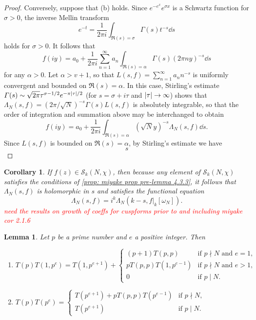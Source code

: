 \documentclass[10pt,leqno,twoside,b5paper]{article}
\theoremstyle{plain}
\newtheorem{lemma}[lem]{Lemma}
\newtheorem{corollary}[lem]{Corollary}
\theoremstyle{definition}
\numberwithin{equation}{section}
\numberwithin{lem}{section}
\newcommand{\sai}[1]{\textcolor{red}{#1}}
\begin{document}
\begin{proof}
    Conversely, suppose that (b) holds. Since $e^{-e^x}e^{\sigma x}$ is a Schwartz function for $\sigma>0$, the inverse Mellin transform 
    \[e^{-t} = \frac{1}{2\pi i}\int_{\Re(s) = \sigma}\varGamma(s)t^{-s}\dd s\]
    holds for $\sigma>0$. It follows that 
    \[f(iy) = a_0 + \frac{1}{2\pi i}\sum_{n=1}^\infty a_n\int_{\Re(s) =\alpha}\varGamma(s)(2\pi n y)^{-s}\dd s\] for any $\alpha>0$. Let $\alpha>v+1$, so that $L(s,f) = \sum_{n=1}^\infty a_nn^{-s}$ is uniformly convergent and bounded on $\Re(s) = \alpha$. In this case, Stirling's estimate $\varGamma(s)\sim \sqrt{2\pi} \tau^{\sigma -1/2}e^{-\pi\abs{\tau}/2}$ (for $s = \sigma + i\tau$ and $\abs{\tau}\to\infty$) shows that $\varLambda_N(s,f) = (2\pi/\sqrt{N})^{-s}\varGamma(s)L(s,f)$ is absolutely integrable, so that the order of integration and summation above may be interchanged to obtain
    \[f(iy) = a_0 + \frac{1}{2\pi i} \int_{\Re(s) = \alpha} (\sqrt{N}y)^{-s}\varLambda_N(s,f)\dd s.\]
    Since $L(s,f)$ is bounded on $\Re(s) = \alpha$, by Stirling's estimate we have 
    \begin{equation}
        s
    \end{equation}
\end{proof}
\begin{corollary}\label{cor: miyake cor 4.3.7}
    If $f(z)\in \mathcal S_k(N,\chi)$, then because any element of $\mathcal S_k(N,\chi)$ satisfies the conditions of \cref{prop: miyake prop pre-lemma 4.3.3}, it follows that $\varLambda_N(s,f)$ is holomorphic in $s$ and satisfies the functional equation
    \[\varLambda_N(s,f) = i^k\varLambda_N(k-s,f|_k[\omega_N]).\]\sai{need the results on growth of coeffs for cuspforms prior to and including miyake cor 2.1.6}
\end{corollary}
\begin{lemma}\label{lem: miyake lem 4.5.7}
    Let $p$ be a prime number and $e$ a positive integer. Then \begin{enumerate}[label=\textup{(\arabic*)}]
        \item $T(p)T(1,p^e) = T(1,p^{e+1}) + \begin{cases}
            (p+1)T(p,p) & \text{if $p\nmid N$ and $e=1$,}\\
            pT(p,p)T(1,p^{e-1}) & \text{if $p\nmid N$ and $e > 1$,}\\
            0 & \text{if $p\mid N$.}
        \end{cases}$
        \item $T(p)T(p^e) = \begin{cases}
            T(p^{e+1})+pT(p,p)T(p^{e-1}) & \text{if $p\nmid N$,}\\
            T(p^{e+1}) & \text{if $p\mid N$.}
        \end{cases}$
    \end{enumerate}
\end{lemma}
\end{document}
